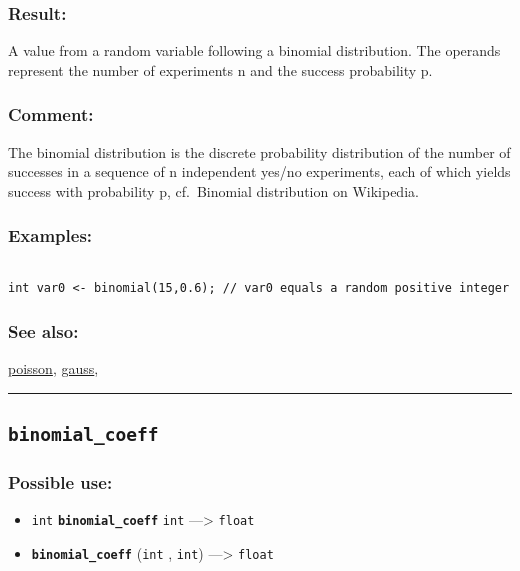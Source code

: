 \documentclass[]{book}
\providecommand{\tightlist}{%
  \setlength{\itemsep}{0pt}\setlength{\parskip}{0pt}}
\theoremstyle{definition}
\theoremstyle{definition}
\theoremstyle{definition}
\theoremstyle{remark}
\begin{document}
\subsubsection{Result:}\label{result-69}

A value from a random variable following a binomial distribution. The
operands represent the number of experiments n and the success
probability p.

\subsubsection{Comment:}\label{comment-15}

The binomial distribution is the discrete probability distribution of
the number of successes in a sequence of n independent yes/no
experiments, each of which yields success with probability p,
cf.~Binomial distribution on Wikipedia.

\subsubsection{Examples:}\label{examples-56}

\begin{verbatim}
 
int var0 <- binomial(15,0.6); // var0 equals a random positive integer
\end{verbatim}

\subsubsection{See also:}\label{see-also-45}

\href{OperatorsNR\#poisson}{poisson}, \href{OperatorsDH\#gauss}{gauss},

\begin{center}\rule{0.5\linewidth}{\linethickness}\end{center}

\subsection{\texorpdfstring{\texttt{binomial\_coeff}}{binomial\_coeff}}\label{binomial_coeff}

\subsubsection{Possible use:}\label{possible-use-71}

\begin{itemize}
\tightlist
\item
  \texttt{int} \textbf{\texttt{binomial\_coeff}} \texttt{int}
  ---\textgreater{} \texttt{float}
\item
  \textbf{\texttt{binomial\_coeff}} (\texttt{int} , \texttt{int})
  ---\textgreater{} \texttt{float}
\end{itemize}
\end{document}
